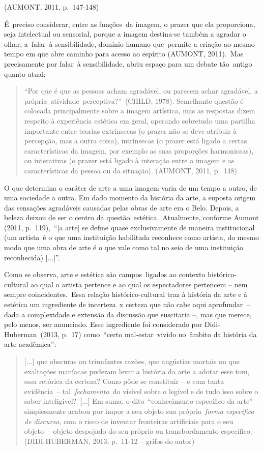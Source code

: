 \documentclass[
  letterpaper,
]{abntex2}
\begin{document}
(AUMONT, 2011, p.~147-148) ~

É~preciso considerar, entre as funções~da imagem, o prazer que ela
proporciona, seja intelectual ou sensorial, porque a imagem destina-se
também a agradar o olhar, a~falar~à sensibilidade, domínio humano
que~permite a criação ao mesmo tempo em que abre caminho para acesso ao
espírito (AUMONT, 2011).~Mas precisamente por falar~à sensibilidade,
abriu espaço para um debate tão~antigo quanto atual:~ ~

\begin{quote}
``Por que é que as pessoas acham agradável, ou parecem achar agradável,
a própria~atividade~perceptiva?''~(CHILD, 1978). Semelhante questão é
colocada principalmente sobre a imagem artística, mas as respostas dizem
respeito à experiência estética em geral, operando sobretudo uma
partilha importante entre teorias extrínsecas (o prazer não se deve
atribuir à percepção, mas a outra coisa), intrínsecas (o prazer está
ligado a certas características da imagem, por exemplo as suas
proporções harmoniosas), ou interativas (o prazer está ligado à
interação entre a imagem e as características da pessoa ou da situação).
(AUMONT, 2011, p.~148)~ ~
\end{quote}

O que determina o caráter de arte a uma imagem varia de um tempo a
outro, de uma sociedade a outra. Em dado momento da história da arte, a
suposta origem das sensações agradáveis causadas pelas obras de arte era
o Belo. Depois, a beleza deixou de ser o centro da
questão~estética.~Atualmente, conforme Aumont (2011, p.~119),~``{[}a
arte{]} se define quase exclusivamente de maneira institucional (um
artista~é o que uma instituição habilitada reconhece como artista, do
mesmo modo que uma obra de arte é o que vale como tal no seio de uma
instituição reconhecida) {[}...{]}''.~

Como se observa, arte e estética são campos~ligados ao contexto
histórico-cultural ao qual o artista pertence e ao qual os espectadores
pertencem -- nem sempre coincidentes.~Essa relação histórico-cultural
traz à história da arte e à estética um ingrediente de incerteza~x
certeza que não cabe aqui aprofundar~-- dada a complexidade e extensão
da discussão que suscitaria --, mas que merece, pelo menos, ser
anunciado. Esse ingrediente foi considerado por Didi-Huberman~(2013,
p.~17) como~``certo mal-estar~vivido no~âmbito da história da arte
acadêmica'':~ ~

\begin{quote}
{[}...{]} que obscuras ou triunfantes razões, que angústias mortais ou
que exaltações maníacas puderam levar a história da arte a adotar esse
tom, essa retórica da certeza? Como pôde se constituir -- e com tanta
evidência~-- tal~\emph{fechamento~}do visível sobre o legível e de tudo
isso sobre o saber inteligível?~{[}...{]} Em suma, o dito~``conhecimento
específico da arte'' simplesmente acabou por impor a seu objeto sua
própria~\emph{forma específica de discurso}, com o risco de inventar
fronteiras artificiais para o seu objeto~-- objeto despojado do seu
próprio ou transbordamento específico. (DIDI-HUBERMAN, 2013, p.~11-12 --
grifos do autor)~ ~
\end{quote}
\end{document}

